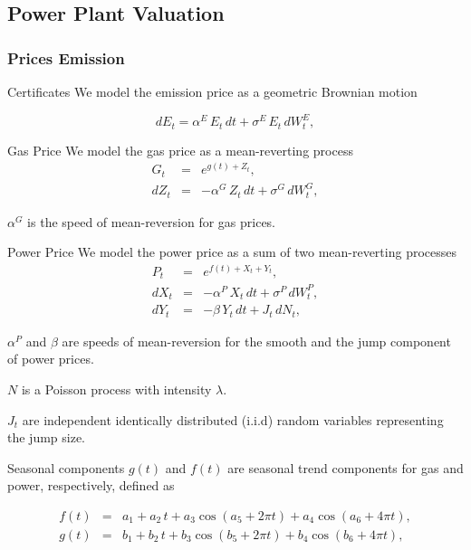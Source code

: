 \subsection{Power Plant Valuation}
\subsubsection{Prices  Emission}
Certificates We model the emission price as a geometric Brownian motion

\begin{equation}
d{E}_{t}=\alpha^{E}\, E_{t}\, d{t}+\sigma^{E}\, E_{t}\, d{W}_{t}^{E},\label{co2}
\end{equation}


Gas Price 
	We model the gas price as a mean-reverting process 
		\begin{eqnarray}
		G_{t} & = & e^{g(t)+Z_{t}},\nonumber \\
		d{Z}_{t} & = & -\alpha^{G}\, Z_{t}\, d{t}+\sigma^{G}\, d{W}_{t}^{G},\label{gas}
		\end{eqnarray}

	$\alpha^{G}$ is the speed of mean-reversion for gas prices. 


Power Price 
	We model the power price as a sum of two mean-reverting processes
		\begin{eqnarray}
		P_{t} & = & e^{f(t)+X_{t}+Y_{t}},\nonumber \\
		d{X}_{t} & = & -\alpha^{P}\, X_{t}\, d{t}+\sigma^{P}\, d{W}_{t}^{P},\nonumber \\
		d{Y}_{t} & = & -\beta\, Y_{t}\, d{t}+J_{t}\, d{N}_{t},\label{power}
		\end{eqnarray}

	$\alpha^{P}$ and $\beta$ are speeds of mean-reversion for the smooth and the jump component of power prices. 

	$N$ is a Poisson process with intensity $\lambda$. 

	$J_{t}$ are independent identically distributed (i.i.d) random variables representing the jump size. 


Seasonal components 
	$g(t)$ and $f(t)$ are seasonal trend components for gas and power, respectively, defined as

	\begin{eqnarray}
	f(t) & = & a_{1}+a_{2}\, t+a_{3}\cos(a_{5}+2\pi t)+a_{4}\cos(a_{6}+4\pi t),\nonumber \\
	g(t) & = & b_{1}+b_{2}\, t+b_{3}\cos(b_{5}+2\pi t)+b_{4}\cos(b_{6}+4\pi t),\nonumber \\
	\label{grseasonality}
	\end{eqnarray}

